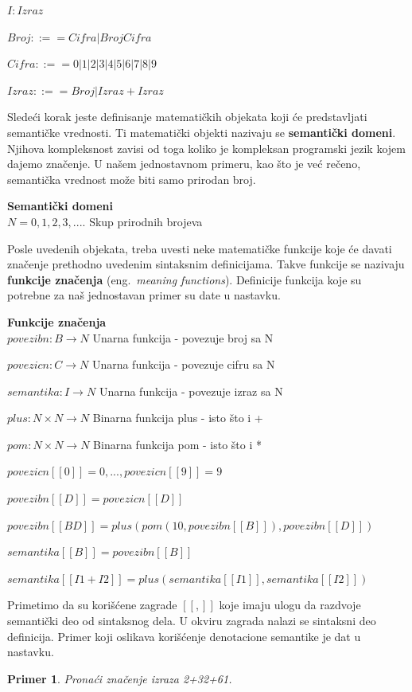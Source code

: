 \documentclass[a4paper]{article}
\newtheorem{primer}{Primer}[section]
\begin{document}
{\begin{tcolorbox}
$I: Izraz $

$ Broj ::== Cifra | Broj Cifra $

$ Cifra ::== 0 | 1 | 2 | 3 | 4 | 5 | 6 | 7 | 8 | 9 $

$ Izraz ::== Broj | Izraz+Izraz $
\end{tcolorbox}

Sledeći korak jeste definisanje matematičkih objekata koji će predstavljati semantičke vrednosti.  Ti matematički objekti nazivaju se \textbf{semantički domeni}. Njihova kompleksnost zavisi od toga koliko je kompleksan programski jezik kojem dajemo značenje. U našem jednostavnom primeru, kao što je već rečeno, semantička vrednost može biti samo prirodan broj.
\begin{tcolorbox}
\textbf{Semantički domeni}
\\

$N={0,1,2,3,....} $  \qquad\qquad Skup prirodnih brojeva

\end{tcolorbox}
Posle uvedenih objekata, treba uvesti neke matematičke funkcije koje će davati značenje prethodno uvedenim sintaksnim definicijama. Takve funkcije se nazivaju \textbf{funkcije značenja }(eng.~{\em meaning functions}). Definicije funkcija koje su potrebne za naš jednostavan primer su date u nastavku.
\begin{tcolorbox}
\textbf{Funkcije značenja}
\\

$povezibn: B \rightarrow N $  \qquad Unarna funkcija - povezuje broj sa N

$povezicn: C \rightarrow N $  \qquad Unarna funkcija - povezuje cifru sa N

$semantika: I \rightarrow N $   \qquad Unarna funkcija - povezuje izraz sa N

$plus: N \times N \rightarrow N $  \qquad Binarna funkcija plus - isto što i +

$pom: N \times N \rightarrow N $ \qquad Binarna funkcija pom - isto što i *

$ povezicn[[0]] = 0,... ,povezicn[[9]] = 9 $

$ povezibn[[D]] = povezicn[[D]] $

$ povezibn[[B D]] = plus(pom(10, povezibn[[B]]),povezibn[[D]]) $

$ semantika[[B]] = povezibn[[B]] $

$ semantika[[I1 + I2]] = plus(semantika[[I1]],semantika[[I2]]) $

\end{tcolorbox}
Primetimo da su korišćene zagrade $ [[,]]$ koje imaju ulogu da razdvoje semantički deo od sintaksnog dela. U okviru zagrada nalazi se sintaksni deo definicija. Primer koji oslikava korišćenje denotacione semantike je dat u nastavku.
\begin{primer}
Pronaći značenje izraza 2+32+61.


\end{primer}}
\end{document}
